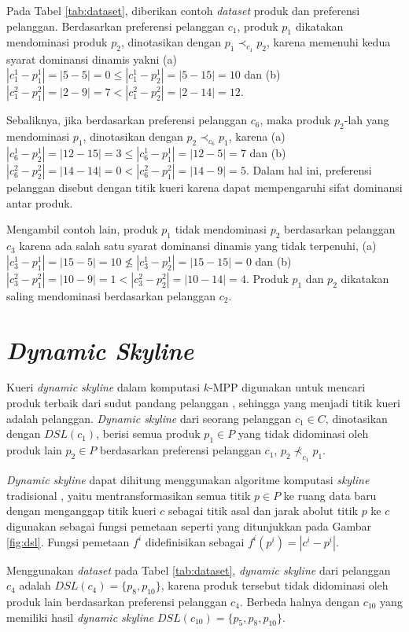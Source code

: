 Pada Tabel \ref{tab:dataset}, diberikan contoh \textit{dataset} produk dan preferensi pelanggan. Berdasarkan preferensi pelanggan $c_1$, produk $p_1$ dikatakan mendominasi produk $p_2$, dinotasikan dengan $p_1 \prec_{c_1} p_2$, karena memenuhi kedua syarat dominansi dinamis yakni (a) $|c_1^1 - p_1^1| = |5-5| = 0 \leq |c_1^1 - p_2^1| = |5-15| = 10$ dan (b) $|c_1^2 - p_1^2| = |2-9| = 7 < |c_1^2 - p_2^2| = |2-14| = 12$.

Sebaliknya, jika berdasarkan preferensi pelanggan $c_6$, maka produk $p_2$-lah yang mendominasi $p_1$, dinotasikan dengan $p_2 \prec_{c_6} p_1$, karena (a) $|c_6^1 - p_2^1| = |12-15| = 3 \leq |c_6^1 - p_1^1| = |12-5| = 7$ dan (b) $|c_6^2 - p_2^2| = |14-14| = 0 < |c_6^2 - p_1^2| = |14-9| = 5$. Dalam hal ini, preferensi pelanggan disebut dengan titik kueri karena dapat mempengaruhi sifat dominansi antar produk.

Mengambil contoh lain, produk $p_1$ tidak mendominasi $p_2$ berdasarkan pelanggan $c_3$ karena ada salah satu syarat dominansi dinamis yang tidak terpenuhi, (a) $|c_3^1 - p_1^1| = |15-5| = 10 \nleq |c_3^1 - p_2^1| = |15-15| = 0$ dan (b) $|c_3^2 - p_1^2| = |10-9| = 1 < |c_3^2 - p_2^2| = |10-14| = 4$. Produk $p_1$ dan $p_2$ dikatakan saling mendominasi berdasarkan pelanggan $c_2$.

\section{\textit{Dynamic Skyline}}
\tab Kueri \textit{dynamic skyline} dalam komputasi $k$-MPP digunakan untuk mencari produk terbaik dari sudut pandang pelanggan \cite{kmpp}, sehingga yang menjadi titik kueri adalah pelanggan. \textit{Dynamic skyline} \cite{dynamic-skyline} dari seorang pelanggan $c_1 \in C$, dinotasikan dengan $DSL(c_1)$, berisi semua produk $p_1 \in P$ yang tidak didominasi oleh produk lain $p_2 \in P$ berdasarkan preferensi pelanggan $c_1$, $p_2 \nprec_{c_1} p_1$.

\textit{Dynamic skyline} dapat dihitung menggunakan algoritme komputasi \textit{skyline} tradisional \cite{skyline}, yaitu mentransformasikan semua titik $p \in P$ ke ruang data baru dengan menganggap titik kueri $c$ sebagai titik asal dan jarak abolut titik $p$ ke $c$ digunakan sebagai fungsi pemetaan seperti yang ditunjukkan pada Gambar \ref{fig:dsl}. Fungsi pemetaan $f^i$ didefinisikan sebagai $f^i (p^i) = |c^i-p^i|$.

Menggunakan \textit{dataset} pada Tabel \ref{tab:dataset}, \textit{dynamic skyline} dari pelanggan $c_4$ adalah $DSL(c_4) = \{p_8, p_{10}\}$, karena produk tersebut tidak didominasi oleh produk lain berdasarkan preferensi pelanggan $c_4$. Berbeda halnya dengan $c_{10}$ yang memiliki hasil \textit{dynamic skyline} $DSL(c_{10}) = \{p_5, p_8, p_{10}\}$.

